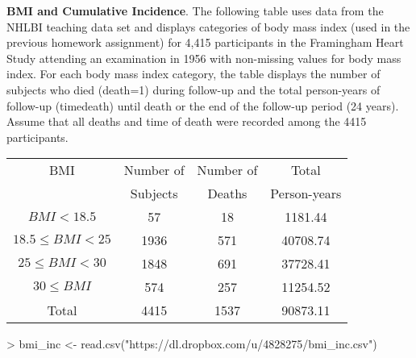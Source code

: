\documentclass{article}
\begin{document}
\pagebreak 
\textbf{BMI and Cumulative Incidence}. The following table uses data from the NHLBI teaching data set and 
displays categories of body mass index (used in the previous homework assignment) for 4,415 
participants in the Framingham Heart Study attending an examination in 1956 with non-missing values 
for body mass index. For each body mass index category, the table displays the number of subjects 
who died (death=1) during follow-up and the total person-years of follow-up (timedeath) until death or 
the end of the follow-up period (24 years). Assume that all deaths and time of death were recorded 
among the 4415 participants.

\begin{table}[ht]
\begin{center}
\begin{tabular}{cccc}
BMI & Number of & Number of  & Total \\
    & Subjects  & Deaths     & Person-years\\
\hline
\(BMI < 18.5\)        & 57 & 18 & 1181.44 \\
\(18.5 \le BMI < 25\) & 1936 & 571 & 40708.74 \\
\(25 \le BMI < 30\)   & 1848 & 691 & 37728.41 \\
\(30 \le BMI\)          & 574 & 257 & 11254.52 \\
\hline
Total               & 4415 & 1537 & 90873.11
\end{tabular}
\end{center}
\end{table}


\begin{Schunk}
\begin{Sinput}
> bmi_inc <- read.csv("https://dl.dropbox.com/u/4828275/bmi_inc.csv")
\end{Sinput}
\end{Schunk}
\end{document}
